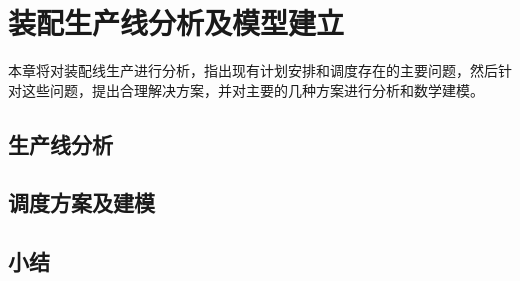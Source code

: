 \chapter{装配生产线分析及模型建立}
本章将对装配线生产进行分析，指出现有计划安排和调度存在的主要问题，然后针对这些问题，提出合理解决方案，并对主要的几种方案进行分析和数学建模。
\section{生产线分析}


\section{调度方案及建模}


\section{小结}